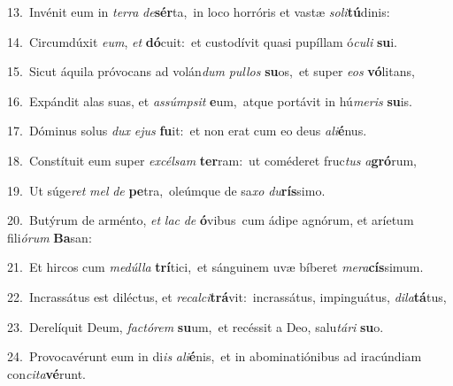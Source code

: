 {\numbfont\textcolor{\numbcolor}{13.}}~Invénit eum in \textit{ter}\-\textit{ra} \textit{de}\-\textbf{sér}ta,~\star in loco horróris et vastæ \textit{so}\-\textit{li}\textbf{tú}dinis:\par
{\numbfont\textcolor{\numbcolor}{14.}}~Circumdúxit \textit{e}\-\textit{um}, \textit{et} \textbf{dó}\-cuit:~\star et custodívit quasi pupíllam ó\-\textit{cu}\-\textit{li} \textbf{su}\-i.\par
{\numbfont\textcolor{\numbcolor}{15.}}~Sicut áquila próvocans ad volán\textit{dum} \textit{pul}\-\textit{los} \textbf{su}\-os,~\star et super \textit{e}\-\textit{os} \textbf{vó}\-litans,\par
{\numbfont\textcolor{\numbcolor}{16.}}~Expándit alas suas, et \textit{as}\-\textit{súmp}\textit{sit} \textbf{e}\-um,~\star atque portávit in hú\-\textit{me}\-\textit{ris} \textbf{su}\-is.\par
{\numbfont\textcolor{\numbcolor}{17.}}~Dóminus solus \textit{dux} \textit{e}\-\textit{jus} \textbf{fu}\-it:~\star et non erat cum eo deus \textit{a}\-\textit{li}\textbf{é}nus.\par
{\numbfont\textcolor{\numbcolor}{18.}}~Constítuit eum super \textit{ex}\-\textit{cél}\textit{sam} \textbf{ter}\-ram:~\star ut coméderet fruc\textit{tus} \textit{a}\-\textbf{gró}rum,\par
{\numbfont\textcolor{\numbcolor}{19.}}~Ut súge\textit{ret} \textit{mel} \textit{de} \textbf{pe}\-tra,~\star oleúmque de sa\textit{xo} \textit{du}\-\textbf{rís}simo.\par
{\numbfont\textcolor{\numbcolor}{20.}}~Butýrum de arménto, \textit{et} \textit{lac} \textit{de} \textbf{ó}\-vibus~\star cum ádipe agnórum, et aríetum fili\-\textit{ó}\-\textit{rum} \textbf{Ba}\-san:\par
{\numbfont\textcolor{\numbcolor}{21.}}~Et hircos cum \textit{me}\-\textit{dúl}\textit{la} \textbf{trí}\-tici,~\star et sánguinem uvæ bíberet \textit{me}\-\textit{ra}\textbf{cís}simum.\par
{\numbfont\textcolor{\numbcolor}{22.}}~Incrassátus est diléctus, et \textit{re}\-\textit{cal}\textit{ci}\textbf{trá}vit:~\star incrassátus, impinguátus, \textit{di}\-\textit{la}\textbf{tá}tus,\par
{\numbfont\textcolor{\numbcolor}{23.}}~Derelíquit Deum, \textit{fac}\-\textit{tó}\textit{rem} \textbf{su}\-um,~\star et recéssit a Deo, salu\-\textit{tá}\-\textit{ri} \textbf{su}\-o.\par
{\numbfont\textcolor{\numbcolor}{24.}}~Provocavérunt eum in di\textit{is} \textit{a}\-\textit{li}\textbf{é}nis,~\star et in abominatiónibus ad iracúndiam con\-\textit{ci}\-\textit{ta}\textbf{vé}runt.\par
